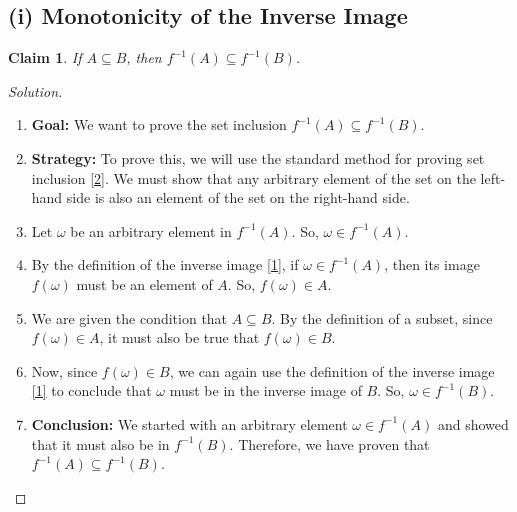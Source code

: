 \documentclass[11pt,a4paper]{article}
\newtheorem{lemma}{Claim}
\newenvironment{solution}{\begin{proof}[Solution]}{\end{proof}}
\begin{document}
\subsection*{(i) Monotonicity of the Inverse Image}

\begin{lemma}
If $A \subseteq B$, then $f^{-1}(A) \subseteq f^{-1}(B)$.
\end{lemma}

\begin{solution}
\begin{enumerate}
    \item \textbf{Goal:} We want to prove the set inclusion $f^{-1}(A) \subseteq f^{-1}(B)$.

    \item \textbf{Strategy:} To prove this, we will use the standard method for proving set inclusion \hyperlink{note2}{[2]}. We must show that any arbitrary element of the set on the left-hand side is also an element of the set on the right-hand side.

    \item Let $\omega$ be an arbitrary element in $f^{-1}(A)$. So, $\omega \in f^{-1}(A)$.

    \item By the definition of the inverse image \hyperlink{note1}{[1]}, if $\omega \in f^{-1}(A)$, then its image $f(\omega)$ must be an element of $A$. So, $f(\omega) \in A$.

    \item We are given the condition that $A \subseteq B$. By the definition of a subset, since $f(\omega) \in A$, it must also be true that $f(\omega) \in B$.

    \item Now, since $f(\omega) \in B$, we can again use the definition of the inverse image \hyperlink{note1}{[1]} to conclude that $\omega$ must be in the inverse image of $B$. So, $\omega \in f^{-1}(B)$.

    \item \textbf{Conclusion:} We started with an arbitrary element $\omega \in f^{-1}(A)$ and showed that it must also be in $f^{-1}(B)$. Therefore, we have proven that $f^{-1}(A) \subseteq f^{-1}(B)$.
\end{enumerate}
\end{solution}
\end{document}

